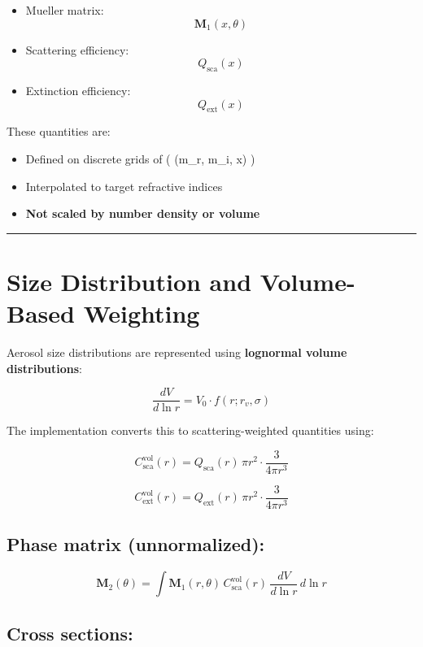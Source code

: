\documentclass[
  letterpaper,
]{scrbook}
\providecommand{\tightlist}{%
  \setlength{\itemsep}{0pt}\setlength{\parskip}{0pt}}
\begin{document}
\begin{itemize}
\tightlist
\item
  Mueller matrix: \[
  \mathbf{M}_1(x, \theta)
  \]
\item
  Scattering efficiency: \[
  Q_{\text{sca}}(x)
  \]
\item
  Extinction efficiency: \[
  Q_{\text{ext}}(x)
  \]
\end{itemize}

These quantities are:

\begin{itemize}
\tightlist
\item
  Defined on discrete grids of ( (m\_r, m\_i, x) )\\
\item
  Interpolated to target refractive indices\\
\item
  \textbf{Not scaled by number density or volume}
\end{itemize}

\begin{center}\rule{0.5\linewidth}{0.5pt}\end{center}

\section{Size Distribution and Volume-Based
Weighting}\label{size-distribution-and-volume-based-weighting}

Aerosol size distributions are represented using \textbf{lognormal
volume distributions}:

\[
\frac{dV}{d\ln r} = V_0 \cdot f(r; r_v, \sigma)
\]

The implementation converts this to scattering-weighted quantities
using:

\[
C_{\text{sca}}^{\text{vol}}(r)
=
Q_{\text{sca}}(r)\,\pi r^2 \cdot \frac{3}{4\pi r^3}
\]

\[
C_{\text{ext}}^{\text{vol}}(r)
=
Q_{\text{ext}}(r)\,\pi r^2 \cdot \frac{3}{4\pi r^3}
\]

\subsection{Phase matrix
(unnormalized):}\label{phase-matrix-unnormalized}

\[
\mathbf{M}_2(\theta)
=
\int \mathbf{M}_1(r,\theta)\,
C_{\text{sca}}^{\text{vol}}(r)\,
\frac{dV}{d\ln r}\, d\ln r
\]

\subsection{Cross sections:}\label{cross-sections}
\end{document}
